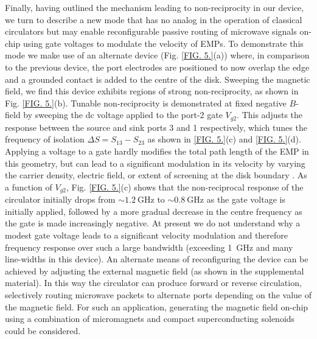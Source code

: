 Finally, having outlined the mechanism leading to non-reciprocity in our device, we turn to describe a new mode that has no analog in the operation of classical circulators but may enable reconfigurable passive routing of microwave signals on-chip using gate voltages to modulate the velocity of EMPs. To demonstrate this mode we make use of an alternate device (Fig. \ref{FIG. 5.}(a)) where, in comparison to the previous device, the port electrodes are positioned to now overlap the edge and a grounded contact is added to the centre of the disk. Sweeping the magnetic field, we find this device exhibits regions of strong non-reciprocity, as shown in Fig. \ref{FIG. 5.}(b). Tunable non-reciprocity is demonstrated at fixed negative $B$-field by sweeping the dc voltage applied to the port-2 gate $V_{g2}$.  This adjusts the response between the source and sink ports 3 and 1 respectively, which tunes the frequency of isolation $\Delta  S  = S_{13}-S_{23}$ as shown in \ref{FIG. 5.}(c) and \ref{FIG. 5.}(d). Applying a voltage to a gate hardly modifies the total path length of the EMP in this geometry, but can lead to a significant modulation in its velocity by varying the carrier density, electric field, or extent of screening at the disk boundary \cite{kamata2014fractionalized,kumada2013plasmon}. As a function of $V_{g2}$, Fig. \ref{FIG. 5.}(c) shows that the non-reciprocal response of the circulator initially drops from $\sim \SI{1.2}{\giga\hertz}$ to $\sim \SI{0.8}{\giga\hertz}$ as the gate voltage is initially applied, followed by a more gradual decrease in the centre frequency as the gate is made increasingly negative. At present we do not understand why a modest gate voltage leads to a significant velocity modulation and therefore frequency response over such a large bandwidth (exceeding \SI{1}{\giga\hertz} and many line-widths in this device). An alternate means of reconfiguring the device can be achieved by adjusting the external magnetic field (as shown in the supplemental material).  In this way the circulator can produce forward or reverse circulation, selectively routing microwave packets to alternate ports depending on the value of the magnetic field. For such an application, generating the magnetic field on-chip using a combination of micromagnets \cite{pioro2008electrically} and compact superconducting solenoids could be considered. 

